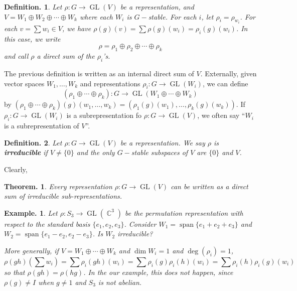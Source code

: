 \documentclass[11pt, a4paper]{memoir}
\DeclareMathOperator{\C}{{\mathbb{C}}}
\theoremstyle{change}
\newtheorem{theorem}{Theorem.}[section]
\theoremstyle{plain}
\theoremstyle{nonumberplain}
\newtheorem{definition}{Definition.}
\newtheorem{example}{Example.}
\DeclareMathOperator{\GL}{GL}
\DeclareMathOperator{\spn}{span}
\numberwithin{equation}{section}
\begin{document}
\begin{definition}
    Let $\rho:G\to\GL(V)$ be a representation, and $V=W_1\oplus W_2\oplus\cdots\oplus W_k$ where each $W_i$ is $G-$stable.
    For each $i$, let $\rho_i=\rho_{w_i}$.
    For each $v=\sum w_i\in V$, we have $\rho(g)(v)=\sum\rho(g)(w_i)=\rho_i(g)(w_i)$.
    In this case, we write
    \begin{equation*}
        \rho=\rho_1\oplus\rho_2\oplus\cdots\oplus\rho_k
    \end{equation*}
    and call $\rho$ a direct sum of the $\rho_i$'s.
\end{definition}
The previous definition is written as an internal direct sum of $V$.
Externally, given vector spaces $W_1,\ldots,W_k$ and representations $\rho_i:G\to\GL(W_i)$, we can define
\begin{equation*}
    (\rho_1\oplus\cdots\oplus\rho_k):G\to\GL(W_1\oplus\cdots\oplus W_k)
\end{equation*}
by $(\rho_1\oplus\cdots\oplus\rho_k)(g)(w_1,\ldots,w_k)=(\rho_1(g)(w_1),\ldots,\rho_k(g)(w_k))$.
If $\rho_i:G\to\GL(W_i)$ is a subrepresentation fo $\rho:G\to\GL(V)$, we often say ``$W_i$ is a subrepresentation of $V$''.
\begin{definition}
    Let $\rho:G\to\GL(V)$ be a representation.
    We say $\rho$ is \textbf{irreducible} if $V\neq\{0\}$ and the only $G-$stable subspaces of $V$ are $\{0\}$ and $V$.
\end{definition}
Clearly,
\begin{theorem}
    Every representation $\rho:G\to\GL(V)$ can be written as a direct sum of irreducible sub-representations.
\end{theorem}
\begin{example}
    Let $\rho:S_3\to\GL(\C^3)$ be the permutation representation with respect to the standard basis $\{e_1,e_2,e_3\}$.
    Consider $W_1=\spn\{e_1+e_2+e_3\}$ and $W_2=\spn\{e_1-e_2,e_2-e_3\}$.
    Is $W_2$ irreducible?
    
    More generally, if $V=W_1\oplus\cdots\oplus W_k$ and $\dim W_i=1$ and $\deg(\rho_i)=1$,
    \begin{equation*}
        \rho(gh)(\sum w_i) = \sum\rho_i(gh)(w_i) = \sum\rho_i(g)\rho_i(h)(w_i)=\sum\rho_i(h)\rho_i(g)(w_i)
    \end{equation*}
    so that $\rho(gh)=\rho(hg)$.
    In the our example, this does not happen, since $\rho(g)\neq I$ when $g\neq 1$ and $S_3$ is not abelian.
\end{example}
\end{document}
